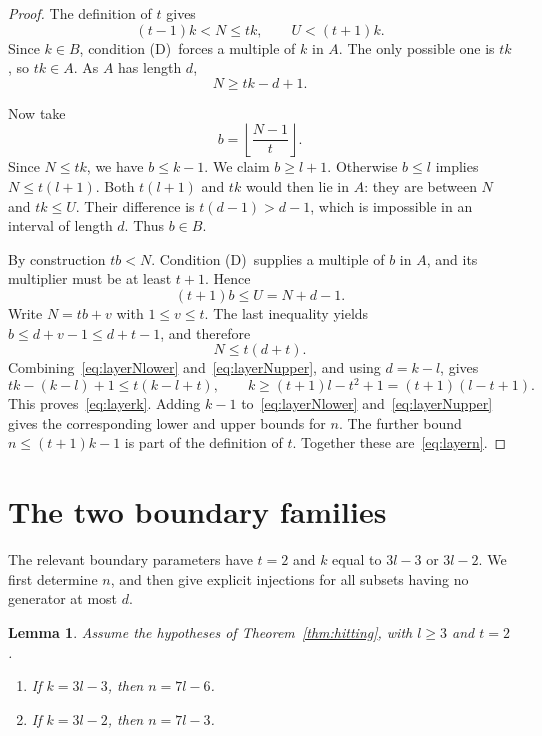 \documentclass[11pt,a4paper]{article}
\numberwithin{equation}{section}
\newtheorem{lemma}[theorem]{Lemma}
\theoremstyle{remark}
\newcommand{\floor}[1]{\left\lfloor #1\right\rfloor}
\newcommand{\Dcond}{\textup{(D)}}
\begin{document}
\begin{proof}
The definition of $t$ gives
\[
  (t-1)k<N\le tk,\qquad U<(t+1)k.
\]
Since $k\in B$, condition \Dcond\ forces a multiple of $k$ in $A$.
The only possible one is $tk$, so $tk\in A$.
As $A$ has length $d$,
\begin{equation}\label{eq:layerNlower}
  N\ge tk-d+1.
\end{equation}

Now take
\[
  b=\floor{\frac{N-1}{t}}.
\]
Since $N\le tk$, we have $b\le k-1$.
We claim $b\ge l+1$.
Otherwise $b\le l$ implies $N\le t(l+1)$.
Both $t(l+1)$ and $tk$ would then lie in $A$: they are between $N$
and $tk\le U$.
Their difference is $t(d-1)>d-1$, which is impossible in an interval
of length $d$. Thus $b\in B$.

By construction $tb<N$.
Condition \Dcond\ supplies a multiple of $b$ in $A$, and its multiplier
must be at least $t+1$. Hence
\[
  (t+1)b\le U=N+d-1.
\]
Write $N=tb+v$ with $1\le v\le t$.
The last inequality yields $b\le d+v-1\le d+t-1$, and therefore
\begin{equation}\label{eq:layerNupper}
  N\le t(d+t).
\end{equation}
Combining~\eqref{eq:layerNlower} and~\eqref{eq:layerNupper}, and using
$d=k-l$, gives
\[
  tk-(k-l)+1\le t(k-l+t),
  \qquad
  k\ge(t+1)l-t^2+1=(t+1)(l-t+1).
\]
This proves~\eqref{eq:layerk}.
Adding $k-1$ to~\eqref{eq:layerNlower} and~\eqref{eq:layerNupper}
gives the corresponding lower and upper bounds for $n$.
The further bound $n\le(t+1)k-1$ is part of the definition of $t$.
Together these are~\eqref{eq:layern}.
\end{proof}

\section{The two boundary families}\label{sec:boundary}

The relevant boundary parameters have $t=2$ and $k$ equal to
$3l-3$ or $3l-2$. We first determine $n$, and then give explicit
injections for all subsets having no generator at most $d$.

\begin{lemma}\label{lem:boundaryparameters}
Assume the hypotheses of Theorem~\ref{thm:hitting}, with $l\ge3$ and
$t=2$.
\begin{enumerate}[label=\textup{(\roman*)}]
\item If $k=3l-3$, then $n=7l-6$.
\item If $k=3l-2$, then $n=7l-3$.
\end{enumerate}
\end{lemma}
\end{document}
